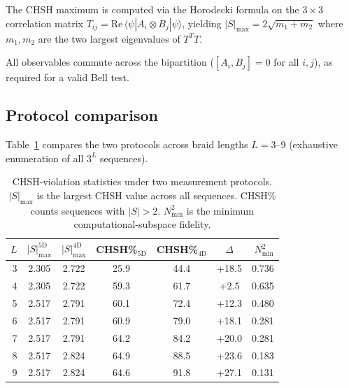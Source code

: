 \documentclass[aps,pra,twocolumn,superscriptaddress,longbibliography,floatfix,nofootinbib]{revtex4-2}
\begin{document}
The CHSH maximum is computed via the Horodecki formula on the
$3\times 3$ correlation matrix
$T_{ij} = \text{Re}\,\langle\psi|A_i \otimes B_j|\psi\rangle$,
yielding $|S|_{\max} = 2\sqrt{m_1+m_2}$ where $m_1,m_2$ are the
two largest eigenvalues of $T^T T$.

All observables commute across the bipartition
($[A_i,B_j]=0$ for all $i,j$), as required for a valid Bell test.

\subsection{Protocol comparison}

Table~\ref{tab:protocol} compares the two protocols across braid
lengths $L=3$--$9$ (exhaustive enumeration of all $3^L$ sequences).

\begin{table}[!htb]
\caption{%
CHSH-violation statistics under two measurement protocols.
$|S|_{\max}$ is the largest CHSH value across all sequences.
CHSH\% counts sequences with $|S|>2$.
$N^2_{\min}$ is the minimum computational-subspace fidelity.
}
\label{tab:protocol}
\begin{ruledtabular}
\begin{tabular}{rcccccr}
$L$ & $|S|^{5\text{D}}_{\max}$ & $|S|^{4\text{D}}_{\max}$
& CHSH\%$_{5\text{D}}$ & CHSH\%$_{4\text{D}}$ & $\Delta$
& $N^2_{\min}$ \\
\hline
3 & 2.305 & 2.722 & 25.9 & 44.4 & +18.5 & 0.736 \\
4 & 2.305 & 2.722 & 59.3 & 61.7 & +2.5 & 0.635 \\
5 & 2.517 & 2.791 & 60.1 & 72.4 & +12.3 & 0.480 \\
6 & 2.517 & 2.791 & 60.9 & 79.0 & +18.1 & 0.281 \\
7 & 2.517 & 2.791 & 64.2 & 84.2 & +20.0 & 0.281 \\
8 & 2.517 & 2.824 & 64.9 & 88.5 & +23.6 & 0.183 \\
9 & 2.517 & 2.824 & 64.6 & 91.8 & +27.1 & 0.131 \\
\end{tabular}
\end{ruledtabular}
\end{table}
\end{document}
